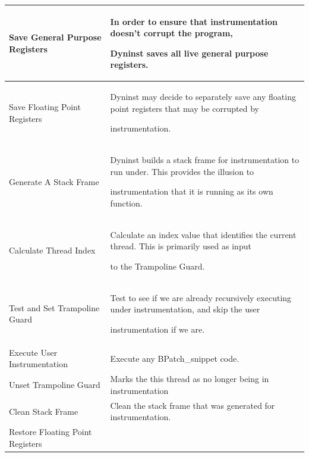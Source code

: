 {{{\begin{flushleft}
\tabletail{}

\tablelasttail{}

\begin{supertabular}{|m{3.24696in}|m{3.25186in}|}

\hline

{ Save General Purpose Registers} &

{ In order to ensure that instrumentation doesn't corrupt the program,

Dyninst saves all live general purpose registers.}\\\hline

{ Save Floating Point Registers} &

{ Dyninst may decide to separately save any floating point registers that may be corrupted by

instrumentation.}\\\hline

{ Generate A Stack Frame} &

{ Dyninst builds a stack frame for instrumentation to run under. This provides the illusion to

instrumentation that it is running as its own function.}\\\hline

{ Calculate Thread Index} &

{ Calculate an index value that identifies the current thread. This is primarily used as input

to the Trampoline Guard.}\\\hline

{ Test and Set Trampoline Guard} &

{ Test to see if we are already recursively executing under instrumentation, and skip the user

instrumentation if we are.}\\\hline

{ Execute User Instrumentation} &

{ Execute any BPatch_snippet code.}\\\hline

{ Unset Trampoline Guard} &

{ Marks the this thread as no longer being in instrumentation}\\\hline

{ Clean Stack Frame} &

{ Clean the stack frame that was generated for instrumentation.}\\\hline

{ Restore Floating Point Registers} &


\end{supertabular}
\end{flushleft}}}}
